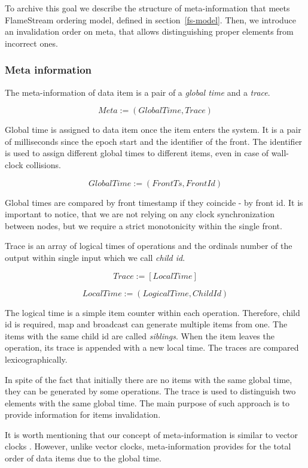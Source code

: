 To archive this goal we describe the structure of meta-information that meets FlameStream ordering model, defined in section~\ref{fs-model}. Then, we introduce an invalidation order on meta, that allows distinguishing proper elements from incorrect ones.

\subsubsection{Meta information}
The meta-information of data item is a pair of a {\it global time} and a {\it trace}.

\[Meta := (GlobalTime, Trace)\]

Global time is assigned to data item once the item enters the system. It is a pair of milliseconds since the epoch start and the identifier of the front. The identifier is used to assign different global times to different items, even in case of wall-clock collisions. 

\[GlobalTime := (FrontTs, FrontId)\]

Global times are compared by front timestamp if they coincide - by front id. It is important to notice, that we are not relying on any clock synchronization between nodes, but we require a strict monotonicity within the single front.

Trace is an array of logical times of operations and the ordinals number of the output within single input which we call {\it child id}. 

\[Trace := [LocalTime]\]

\[LocalTime := (LogicalTime, ChildId)\]

The logical time is a simple item counter within each operation. Therefore, child id is required, map and broadcast can generate multiple items from one. The items with the same child id are called {\it siblings}. When the item leaves the operation, its trace is appended with a new local time. The traces are compared lexicographically.


In spite of the fact that initially there are no items with the same global time, they can be generated by some operations. The trace is used to distinguish two elements with the same global time. The main purpose of such approach is to provide information for items invalidation. 

It is worth mentioning that our concept of meta-information is similar to vector clocks
\cite{fidge1988timestamps, mattern88virtualtime}. However, unlike vector clocks, meta-information provides for the total order of data items due to the global time.

